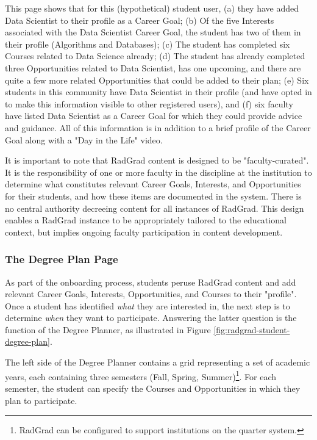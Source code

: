 \documentclass[acmsmall,nonacm]{acmart}
\begin{document}
This page shows that for this (hypothetical) student user, (a) they have added Data Scientist to their profile as a Career Goal; (b) Of the five Interests associated with the Data Scientist Career Goal, the student has two of them in their profile (Algorithms and Databases); (c) The student has completed six Courses related to Data Science already; (d) The student has already completed three Opportunities related to Data Scientist, has one upcoming, and there are quite a few more related Opportunities that could be added to their plan; (e) Six students in this community have Data Scientist in their profile (and have opted in to make this information visible to other registered users), and (f) six faculty have listed Data Scientist as a Career Goal for which they could provide advice and guidance.  All of this information is in addition to a brief profile of the Career Goal along with a "Day in the Life" video.

It is important to note that RadGrad content is designed to be "faculty-curated".  It is the responsibility of one or more faculty in the discipline at the institution to determine what constitutes relevant Career Goals, Interests, and Opportunities for their students, and how these items are documented in the system. There is no central authority decreeing content for all instances of RadGrad. This design enables a RadGrad instance to be appropriately tailored to the educational context, but implies ongoing faculty participation in content development.

\subsubsection{The Degree Plan Page}

As part of the onboarding process, students peruse RadGrad content and add relevant Career Goals, Interests, Opportunities, and Courses to their "profile".  Once a student has identified {\em what} they are interested in, the next step is to determine {\em when} they want to participate. Answering the latter question is the function of the Degree Planner, as illustrated in  Figure \ref{fig:radgrad-student-degree-plan}.

The left side of the Degree Planner contains a grid representing a set of academic years, each containing three semesters (Fall, Spring, Summer)\footnote{RadGrad can be configured to support institutions on the quarter system.}.  For each semester, the student can specify the Courses and Opportunities in which they plan to participate.
\end{document}
